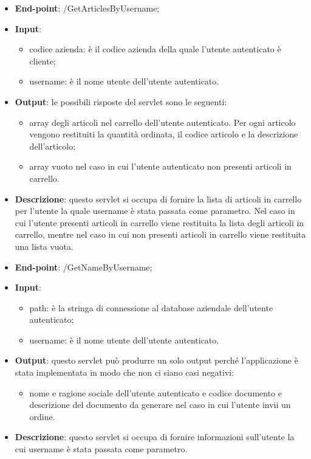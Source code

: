 
\begin{itemize}
	\item \textbf{End-point}: /GetArticlesByUsername;
	\item \textbf{Input}:
		\begin{itemize}
			\item codice azienda: è il codice azienda della quale l'utente autenticato è cliente;
			\item username: è il nome utente dell'utente autenticato.
		\end{itemize}
	\item \textbf{Output}: le possibili risposte del servlet sono le seguenti:
		\begin{itemize}
			\item array degli articoli nel carrello dell'utente autenticato. Per ogni articolo vengono restituiti la quantità ordinata, il codice articolo e la descrizione dell'articolo;
			\item array vuoto nel caso in cui l'utente autenticato non presenti articoli in carrello.
		\end{itemize}
	\item \textbf{Descrizione}: questo servlet si occupa di fornire la lista di articoli in carrello per l'utente la quale username è stata passata come parametro. Nel caso in cui l'utente presenti articoli in carrello viene restituita la lista degli articoli in carrello, mentre nel caso in cui non presenti articoli in carrello viene restituita una lista vuota.
\end{itemize}


\begin{itemize}
	\item \textbf{End-point}: /GetNameByUsername;
	\item \textbf{Input}:
		\begin{itemize}
			\item path: è la stringa di connessione al database aziendale dell'utente autenticato;
			\item username: è il nome utente dell'utente autenticato.
		\end{itemize}
	\item \textbf{Output}: questo servlet può produrre un solo output perché l'applicazione è stata implementata in modo che non ci siano casi negativi:
		\begin{itemize}
			\item nome e ragione sociale dell'utente autenticato e codice documento e descrizione del documento da generare nel caso in cui l'utente invii un ordine.
		\end{itemize}
	\item \textbf{Descrizione}: questo servlet si occupa di fornire informazioni sull'utente la cui username è stata passata come parametro.
\end{itemize}

